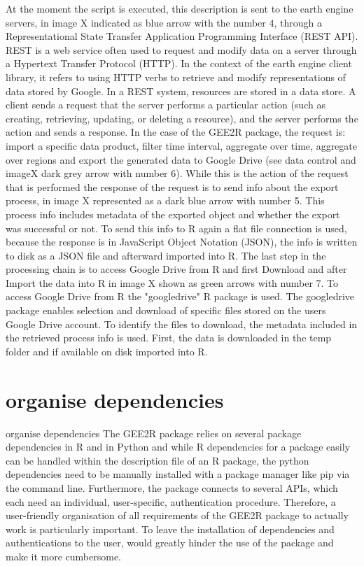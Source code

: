 At the moment the script is executed, this description is sent to the earth engine servers, in image X indicated as blue arrow with the number 4, through a Representational State Transfer Application Programming Interface (REST API). REST is a web service often used to request and modify data on a server through a Hypertext Transfer Protocol (HTTP).
In the context of the earth engine client library, it refers to using HTTP verbs to retrieve and modify representations of data stored by Google.
In a REST system, resources are stored in a data store. A client sends a request that the server performs a particular action (such as creating, retrieving, updating, or deleting a resource), and the server performs the action and sends a response. In the case of the GEE2R package, the request is: import a specific data product, filter time interval, aggregate over time, aggregate over regions and export the generated data to Google Drive (see data control and imageX dark grey arrow with number 6). While this is the action of the request that is performed the response of the request is to send info about the export process, in image X represented as a dark blue arrow with number 5. This process info includes metadata of the exported object and whether the export was successful or not. To send this info to R again a flat file connection is used, because the response is in JavaScript Object Notation (JSON), the info is written to disk as a JSON file and afterward imported into R. The last step in the processing chain is to access Google Drive from R and first Download and after Import the data into R in image X shown as green arrows with number 7. To access Google Drive from R the "googledrive" R package is used. The googledrive package enables selection and download of specific files stored on the users Google Drive account. To identify the files to download, the metadata included in the retrieved process info is used. First, the data is downloaded in the temp folder and if available on disk imported into R.


\section{organise dependencies}

organise dependencies
The GEE2R package relies on several package dependencies in R and in Python and while R dependencies for a package easily can be handled within the description file of an R package, the python dependencies need to be manually installed with a package manager like pip via the command line. Furthermore, the package connects to several APIs, which each need an individual, user-specific, authentication procedure. Therefore, a user-friendly organisation of all requirements of the GEE2R package to actually work is particularly important. To leave the installation of dependencies and authentications to the user, would greatly hinder the use of the package and make it more cumbersome. 

